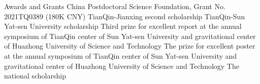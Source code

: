 \begin{rubric}{Awards and Grants}
    \entry*[2021-2023] China Postdoctoral Science Foundation, Grant No. 2021TQ0389 (180K CNY) 
%
    \entry*[2020] TianQin-Jianxing second scholarship
    \entry*[2019] TianQin-Sun Yat-sen University scholarship
    \entry*[2019] Third prize for excellent report at the annual symposium of TianQin center of Sun Yat-sen University and
    gravitational center of Huazhong University of Science and Technology 
    \entry*[2018] The prize for excellent poster at the annual symposium of TianQin center of Sun Yat-sen University and
    gravitational center of Huazhong University of Science and Technology 
    \entry*[2015] The national scholarship
\end{rubric}

